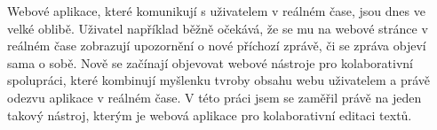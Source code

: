 
Webové aplikace, které komunikují s uživatelem v reálném čase, jsou dnes ve velké oblibě.
Uživatel například běžně očekává, že se mu na webové stránce v reálném čase zobrazují upozornění o nové příchozí zprávě, či se zpráva objeví sama o sobě.
Nově se začínají objevovat webové nástroje pro kolaborativní spolupráci, které kombinují myšlenku tvroby obsahu webu uživatelem a právě odezvu aplikace v reálném čase.
V této práci jsem se zaměřil právě na jeden takový nástroj, kterým je webová aplikace pro kolaborativní editaci textů.









